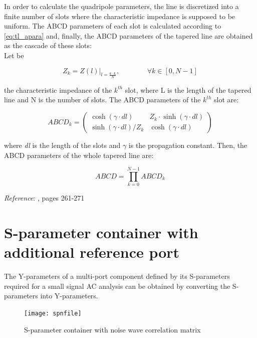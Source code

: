 \noindent In order to calculate the quadripole parameters, the line is discretized into a finite number of slots where the characteristic impedance is supposed to be uniform. The ABCD parameters of each slot is calculated according to \ref{eq:tl_apara} and, finally, the ABCD parameters of the tapered line are obtained as the cascade of these slots:\\

\noindent Let be 

\begin{equation}
Z_k = Z(l)\rvert_{l = \frac{k \cdot L}{N}}, \;\;\;\;\;\;\;\;\;\;\;\;\;\; \forall k \in [0, N-1]
\end{equation} 

\noindent the characteristic impedance of the $k^{th}$ slot, where L is the length of the tapered line and N is the number of slots. The ABCD parameters of the $k^{th}$ slot are:

\begin{equation}
ABCD_k = \begin{pmatrix}
\cosh{\left(\gamma\cdot dl\right)} & Z_k\cdot \sinh{\left(\gamma\cdot dl\right)}\\
\sinh{\left(\gamma\cdot dl\right)} / Z_k & \cosh{\left(\gamma\cdot dl\right)}
\end{pmatrix}
\end{equation}


\noindent where \textit{dl} is the length of the slots and $\gamma$ is the propagation constant. Then, the ABCD parameters of the whole tapered line are:

\begin{equation}
ABCD = \prod\limits_{k=0}^{N-1} ABCD_k
\end{equation}


\textit{Reference}: \cite{Pozar}, pages 261-271

\section{S-parameter container with additional reference port}
\label{sec:spfile}

The Y-parameters of a multi-port component defined by its S-parameters
required for a small signal AC analysis can be obtained by converting
the S-parameters into Y-parameters.

\begin{figure}[ht]
\begin{center}
\texttt{[image: spnfile]}
\end{center}
\caption{S-parameter container with noise wave correlation matrix}
\label{fig:spnfile}
\end{figure}
\FloatBarrier

